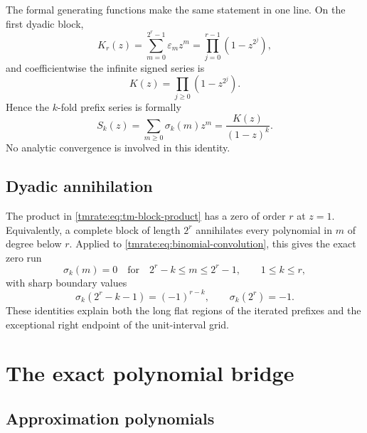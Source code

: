 \documentclass[11pt,oneside]{article}
\theoremstyle{definition}
\theoremstyle{remark}
\begin{document}
The formal generating functions make the same statement in one line.  On the
first dyadic block,
\begin{equation}
 K_r(z)=\sum_{m=0}^{2^r-1}\varepsilon_m z^m
       =\prod_{j=0}^{r-1}(1-z^{2^j}),                      \label{tmrate:eq:tm-block-product}
\end{equation}
and coefficientwise the infinite signed series is
\begin{equation}
 K(z)=\prod_{j\ge0}(1-z^{2^j}).                            \label{tmrate:eq:tm-infinite-product}
\end{equation}
Hence the $k$-fold prefix series is formally
\begin{equation}
 S_k(z)=\sum_{m\ge0}\sigma_k(m)z^m=\frac{K(z)}{(1-z)^k}.  \label{tmrate:eq:prefix-series}
\end{equation}
No analytic convergence is involved in this identity.

\subsection{Dyadic annihilation}

The product in \eqref{tmrate:eq:tm-block-product} has a zero of order $r$ at $z=1$.
Equivalently, a complete block of length $2^r$ annihilates every polynomial in
$m$ of degree below $r$.  Applied to \eqref{tmrate:eq:binomial-convolution}, this gives
the exact zero run
\begin{equation}
 \sigma_k(m)=0
 \quad\text{for}\quad
 2^r-k\le m\le2^r-1,
 \qquad 1\le k\le r,                                     \label{tmrate:eq:zero-run}
\end{equation}
with sharp boundary values
\begin{equation}
 \sigma_k(2^r-k-1)=(-1)^{r-k},
 \qquad
 \sigma_k(2^r)=-1.                                        \label{tmrate:eq:zero-run-boundary}
\end{equation}
These identities explain both the long flat regions of the iterated prefixes and
the exceptional right endpoint of the unit-interval grid.

\section{The exact polynomial bridge}
\label{tmrate:sec:polynomial-bridge}

\subsection{Approximation polynomials}
\end{document}
